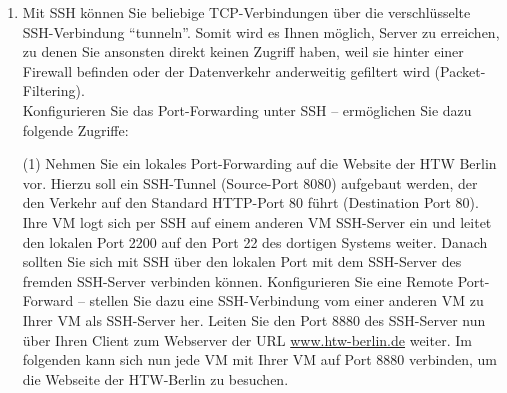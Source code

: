 \documentclass[paper=a4,fontsize=11pt]{scrartcl}%
\numberwithin{equation}{section}
\begin{document}
\begin{enumerate}
\begin{tasks}(1)
	\task Generieren Sie sich ein SSH-Schlüsselpaar! Nutzen Sie hierfür die recherchierten Parameter aus Ihren Notizen.
	\task Beim generieren des Schlüssels werden Sie aufgefordert eine Passphrase einzugeben. Der Private-Key ist durch eine Passphrase geschützt, sodass dieser geheime Schlüssel nur von Ihnen geöffnet werden kann. Wie ist die Passphrase zu wählen? Was gilt es zu beachten?
	\task Verbinden Sie sich von Rechner zu Rechner ohne ein Passwort zu nutzen. D.h. Sie sollten über das eigene LAN hinaus auf eine andere VM via SSH zugreifen können. Sie könne sich hierfür ein neuen Nutzer anlegen (\emph{useradd}).
	\task Setzen Sie die Anzahl der maximalen Login-Fehlversuche auf drei!
	\task Erlauben Sie dem Nutzer \emph{student} nur noch das Auflisten des Home-Verzeichnis, wenn er sich via SSH verbunden hat.
	\task Setzen Sie als Anmeldeverfahren SSH auf reine Public-Key-Kryptografie. Hat dies eventuell auch Nachteile?
\end{tasks}

\begin{center}\Large{\textbf{Aufgabe B -- SSH-Forwarding}}\end{center}\vskip0.25in
	\item Mit SSH können Sie beliebige TCP-Verbindungen über die verschlüsselte SSH-Verbindung \enquote{tunneln}. Somit wird es Ihnen möglich, Server zu erreichen, zu denen Sie ansonsten direkt keinen Zugriff haben, weil sie hinter einer Firewall befinden oder der Datenverkehr anderweitig gefiltert wird (Packet-Filtering).\\
	Konfigurieren Sie das Port-Forwarding unter SSH -- ermöglichen Sie dazu folgende Zugriffe:
	\begin{tasks}(1)
		\task Nehmen Sie ein lokales Port-Forwarding auf die Website der HTW Berlin vor. Hierzu soll ein SSH-Tunnel (Source-Port 8080) aufgebaut werden, der den Verkehr auf den Standard HTTP-Port 80 führt (Destination Port 80).
		\task Ihre VM logt sich per SSH auf einem anderen VM SSH-Server ein und leitet den lokalen Port 2200 auf den Port 22 des dortigen Systems weiter. Danach sollten Sie sich mit SSH über den lokalen Port mit dem SSH-Server des fremden SSH-Server verbinden können.
		\task Konfigurieren Sie eine Remote Port-Forward -- stellen Sie dazu eine SSH-Verbindung vom einer anderen VM zu Ihrer VM als SSH-Server her. Leiten Sie den Port 8880 des SSH-Server nun über Ihren Client zum Webserver der URL \url{www.htw-berlin.de} weiter. Im folgenden kann sich nun jede VM mit Ihrer VM auf Port 8880 verbinden, um die Webseite der HTW-Berlin zu besuchen.
	\end{tasks}
\end{enumerate}
\end{document}

